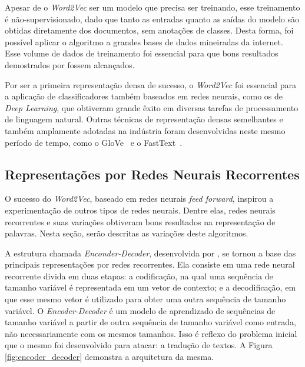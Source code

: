 Apesar de o \textit{Word2Vec} ser um modelo que precisa ser treinando, esse
treinamento é não-supervisionado, dado que tanto as entradas quanto as saídas do
modelo são obtidas diretamente dos documentos, sem anotações de classes.
Desta forma, foi possível aplicar o algoritmo a grandes bases de dados
mineiradas da internet.
Esse volume de dados de treinamento foi essencial para que bons resultados
demostrados por \citet{mikolov13} fossem alcançados.

Por ser a primeira representação densa de sucesso, o \textit{Word2Vec} foi
essencial para a aplicação de classificadores também baseados em redes neurais,
como os de \textit{Deep Learning}, que obtiveram grande êxito em diversas
tarefas de processamento de linguagem natural.
Outras técnicas de representação densas semelhantes e também amplamente adotadas
na indústria foram desenvolvidas neste mesmo período de tempo, como o
GloVe~\cite{pennington14} e o FastText~\cite{bojanowski17}.


\subsection{Representações por Redes Neurais Recorrentes}
\label{representation:rnn}

O sucesso do \textit{Word2Vec}, baseado em redes neurais \textit{feed forward},
inspirou a experimentação de outros tipos de redes neurais.
Dentre elas, redes neurais recorrentes e suas variações obtiveram bons resultados
na representação de palavras.
Nesta seção, serão descritas as variações deste algoritmos.

A estrutura chamada \textit{Enconder-Decoder}, desenvolvida por \citet{cho14},
se tornou a base das principais representações por redes recorrentes.
Ela consiste em uma rede neural recorrente divida em duas etapas: a codificação,
na qual uma sequência de tamanho variável é representada em um
vetor de contexto; e a decodificação, em que esse mesmo vetor é utilizado para
obter uma outra sequência de tamanho variável.
O \textit{Encoder-Decoder} é um modelo de aprendizado de sequências de tamanho
variável a partir de outra sequência de tamanho variável como entrada, não
necessariamente com os mesmos tamanhos.
Isso é reflexo do problema inicial que o mesmo foi desenvolvido para atacar: a
tradução de textos.
A Figura \ref{fig:encoder_decoder} demonstra a arquitetura da mesma.

